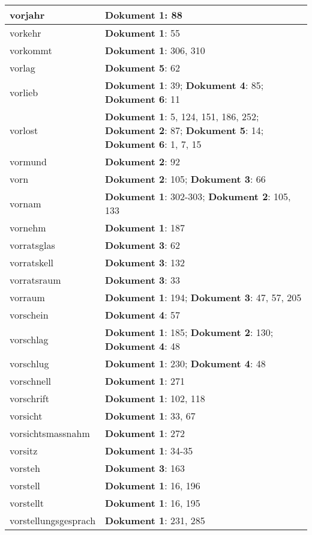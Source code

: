 \documentclass[a5paper]{article}
\begin{document}
\begin{longtable}[l]{|l|p{3in}|}
\hline
vorjahr & \textbf{Dokument 1}: 88 \\
\hline
vorkehr & \textbf{Dokument 1}: 55 \\
\hline
vorkommt & \textbf{Dokument 1}: 306, 310 \\
\hline
vorlag & \textbf{Dokument 5}: 62 \\
\hline
vorlieb & \textbf{Dokument 1}: 39; \textbf{Dokument 4}: 85; \textbf{Dokument 6}: 11 \\
\hline
vorlost & \textbf{Dokument 1}: 5, 124, 151, 186, 252; \textbf{Dokument 2}: 87; \textbf{Dokument 5}: 14; \textbf{Dokument 6}: 1, 7, 15 \\
\hline
vormund & \textbf{Dokument 2}: 92 \\
\hline
vorn & \textbf{Dokument 2}: 105; \textbf{Dokument 3}: 66 \\
\hline
vornam & \textbf{Dokument 1}: 302-303; \textbf{Dokument 2}: 105, 133 \\
\hline
vornehm & \textbf{Dokument 1}: 187 \\
\hline
vorratsglas & \textbf{Dokument 3}: 62 \\
\hline
vorratskell & \textbf{Dokument 3}: 132 \\
\hline
vorratsraum & \textbf{Dokument 3}: 33 \\
\hline
vorraum & \textbf{Dokument 1}: 194; \textbf{Dokument 3}: 47, 57, 205 \\
\hline
vorschein & \textbf{Dokument 4}: 57 \\
\hline
vorschlag & \textbf{Dokument 1}: 185; \textbf{Dokument 2}: 130; \textbf{Dokument 4}: 48 \\
\hline
vorschlug & \textbf{Dokument 1}: 230; \textbf{Dokument 4}: 48 \\
\hline
vorschnell & \textbf{Dokument 1}: 271 \\
\hline
vorschrift & \textbf{Dokument 1}: 102, 118 \\
\hline
vorsicht & \textbf{Dokument 1}: 33, 67 \\
\hline
vorsichtsmassnahm & \textbf{Dokument 1}: 272 \\
\hline
vorsitz & \textbf{Dokument 1}: 34-35 \\
\hline
vorsteh & \textbf{Dokument 3}: 163 \\
\hline
vorstell & \textbf{Dokument 1}: 16, 196 \\
\hline
vorstellt & \textbf{Dokument 1}: 16, 195 \\
\hline
vorstellungsgesprach & \textbf{Dokument 1}: 231, 285 \\
\hline

\end{longtable}
\end{document}
